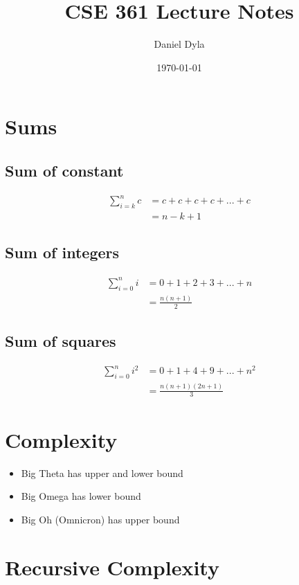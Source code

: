 \documentclass[12pt]{article}
\author{Daniel Dyla}
\date{\today}
\title{CSE 361 Lecture Notes}
\begin{document}
\maketitle

\section{Sums}
\label{sec-1}

\subsection{Sum of constant}
\label{sec-1-1}

\begin{align}
\sum_{i=k}^n c &= c + c + c + c + ... + c \\
&= n - k + 1
\end{align}

\subsection{Sum of integers}
\label{sec-1-2}

\begin{align}
\sum_{i=0}^n i &= 0 + 1 + 2 + 3 + ... + n \\
&= \frac{n(n+1)}{2}
\end{align}

\subsection{Sum of squares}
\label{sec-1-3}

\begin{align}
\sum_{i=0}^n i^2 &= 0 + 1 + 4 + 9 + ... + n^2 \\
&= \frac{n(n+1)(2n+1)}{3}
\end{align}


\section{Complexity}
\label{sec-2}

\begin{itemize}
\item Big Theta has upper and lower bound
\item Big Omega has lower bound
\item Big Oh (Omnicron) has upper bound
\end{itemize}

\section{Recursive Complexity}
\label{sec-3}
\end{document}
